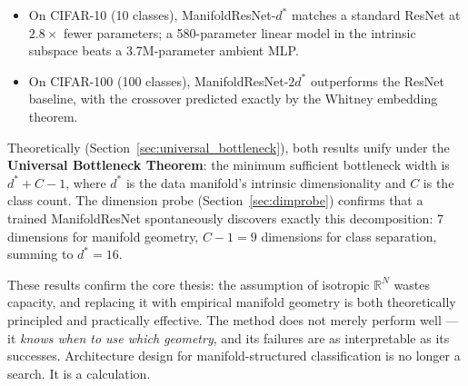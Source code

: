 \documentclass[11pt,letterpaper]{article}
\begin{document}
\begin{itemize}[nosep]
  \item On CIFAR-10 (10 classes), ManifoldResNet-$d^*$ matches a standard
    ResNet at $2.8\times$ fewer parameters; a 580-parameter linear model
    in the intrinsic subspace beats a 3.7M-parameter ambient MLP.
  \item On CIFAR-100 (100 classes), ManifoldResNet-$2d^*$ outperforms the
    ResNet baseline, with the crossover predicted exactly by the Whitney
    embedding theorem.
\end{itemize}

Theoretically (Section~\ref{sec:universal_bottleneck}), both results
unify under the \textbf{Universal Bottleneck Theorem}: the minimum
sufficient bottleneck width is $d^* + C - 1$, where $d^*$ is the
data manifold's intrinsic dimensionality and $C$ is the class count.
The dimension probe (Section~\ref{sec:dimprobe}) confirms that a
trained ManifoldResNet spontaneously discovers exactly this decomposition:
7 dimensions for manifold geometry, $C - 1 = 9$ dimensions for class
separation, summing to $d^* = 16$.

These results confirm the core thesis: the assumption of isotropic
$\mathbb{R}^N$ wastes capacity, and replacing it with empirical manifold
geometry is both theoretically principled and practically effective.
The method does not merely perform well — it \emph{knows when to use
which geometry}, and its failures are as interpretable as its successes.
Architecture design for manifold-structured classification is no longer
a search.  It is a calculation.
\end{document}
